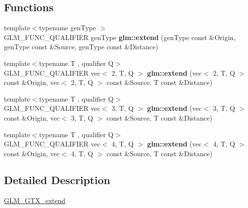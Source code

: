 \subsection*{Functions}
\begin{DoxyCompactItemize}
\item 
\mbox{\label{extend_8inl_a88c4890406fab3280de470ce780e6b9d}} 
{\footnotesize template$<$typename gen\+Type $>$ }\\G\+L\+M\+\_\+\+F\+U\+N\+C\+\_\+\+Q\+U\+A\+L\+I\+F\+I\+ER gen\+Type {\bfseries glm\+::extend} (gen\+Type const \&Origin, gen\+Type const \&Source, gen\+Type const \&Distance)
\item 
\mbox{\label{extend_8inl_ae7c7294c06e86839130ca7744162731c}} 
{\footnotesize template$<$typename T , qualifier Q$>$ }\\G\+L\+M\+\_\+\+F\+U\+N\+C\+\_\+\+Q\+U\+A\+L\+I\+F\+I\+ER vec$<$ 2, T, Q $>$ {\bfseries glm\+::extend} (vec$<$ 2, T, Q $>$ const \&Origin, vec$<$ 2, T, Q $>$ const \&Source, T const \&Distance)
\item 
\mbox{\label{extend_8inl_a9e3293f635716225ee23cb298a04a02f}} 
{\footnotesize template$<$typename T , qualifier Q$>$ }\\G\+L\+M\+\_\+\+F\+U\+N\+C\+\_\+\+Q\+U\+A\+L\+I\+F\+I\+ER vec$<$ 3, T, Q $>$ {\bfseries glm\+::extend} (vec$<$ 3, T, Q $>$ const \&Origin, vec$<$ 3, T, Q $>$ const \&Source, T const \&Distance)
\item 
\mbox{\label{extend_8inl_a4ac1a18c2563193bbc65b772e9bbc25d}} 
{\footnotesize template$<$typename T , qualifier Q$>$ }\\G\+L\+M\+\_\+\+F\+U\+N\+C\+\_\+\+Q\+U\+A\+L\+I\+F\+I\+ER vec$<$ 4, T, Q $>$ {\bfseries glm\+::extend} (vec$<$ 4, T, Q $>$ const \&Origin, vec$<$ 4, T, Q $>$ const \&Source, T const \&Distance)
\end{DoxyCompactItemize}


\subsection{Detailed Description}
\hyperlink{group__gtx__extend}{G\+L\+M\+\_\+\+G\+T\+X\+\_\+extend} 